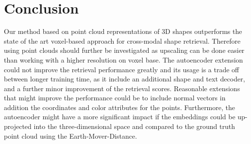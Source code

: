 \documentclass[10pt,twocolumn,letterpaper]{article}
\begin{document}
\section{Conclusion}
Our method based on point cloud representations of 3D shapes outperforms the state of the art voxel-based approach for cross-modal shape retrieval. Therefore using point clouds should further be investigated as upscaling can be done easier than working with a higher resolution on voxel base. The autoencoder extension could not improve the retrieval performance greatly and its usage is a trade off between longer training time, as it include an additional shape and text decoder, and a further minor improvement of the retrieval scores. Reasonable extensions that might improve the performance could be to include normal vectors in addition the coordinates and color attributes for the points. Furthermore, the autoencoder might have a more significant impact if the embeddings could be up-projected into the three-dimensional space and compared to the ground truth point cloud using the Earth-Mover-Distance. 

{\small


}
\end{document}
